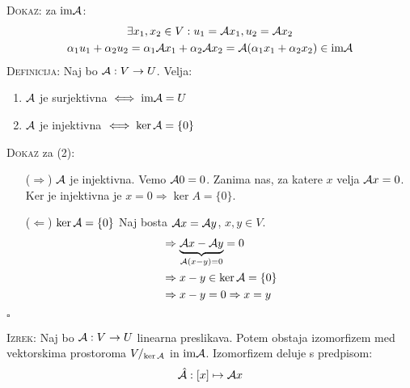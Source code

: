 \textsc{Dokaz:} za $\text{im} \mathcal{A}$: 
\begin{gather*}
\exists x_1, x_2 \in V: u_1 = \mathcal{A} x_1, u_2 = \mathcal{A} x_2 \\
\alpha_1 u_1 + \alpha_2 u_2 = \alpha_1 \mathcal{A} x_1 + \alpha_2 \mathcal{A} x_2 = \mathcal{A}(\alpha_1 x_1 + \alpha_2 x_2) \in \text{im} \mathcal{A}
\end{gather*}
%
\textsc{Definicija:} Naj bo $\mathcal{A}: V \to U$. Velja:
\begin{enumerate}[(1)]
	\item $\mathcal{A}$ je surjektivna $\iff \text{im} \mathcal{A} = U$
	\item $\mathcal{A}$ je injektivna $\iff \ker \mathcal{A} = \{0\}$
\end{enumerate}
\textsc{Dokaz} za (2):
\begin{itemize}
	\item[($\Rightarrow$)] $\mathcal{A}$ je injektivna. Vemo $\mathcal{A}0 = 0$. Zanima nas, za katere $x$ velja $\mathcal{A} x = 0$. Ker je injektivna je $x = 0 \Rightarrow \ker A = \{0\}$.
	\item[($\Leftarrow$)] $\ker \mathcal{A} = \{0\}$ Naj bosta $\mathcal{A} x = \mathcal{A} y$, $x, y \in V$.
	\begin{align*}
	&\Rightarrow \underbrace{\mathcal{A} x - \mathcal{A} y}_{\mathcal{A}(x-y) = 0} = 0 \\
	&\Rightarrow x - y \in \ker \mathcal{A} = \{0\} \\
	&\Rightarrow x - y = 0 \Rightarrow x = y
	\end{align*}
\end{itemize}
\hfill $\square$

\textsc{Izrek:} Naj bo $\mathcal{A}: V \to U$ linearna preslikava. Potem obstaja izomorfizem med vektorskima prostoroma $V/_{\ker \mathcal{A}}$ in $\text{im} \mathcal{A}$. Izomorfizem deluje s predpisom:
\begin{equation*}
\hat{\mathcal{A}}: [x] \mapsto \mathcal{A} x
\end{equation*}

